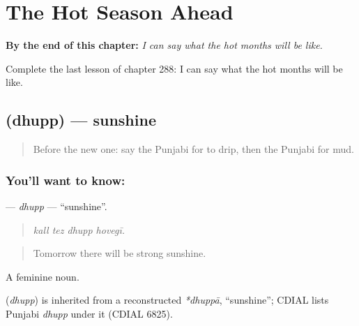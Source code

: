 
\chapter{The Hot Season Ahead}
\label{ch:pa-a2-the-hot-season-ahead}

\begin{chapteropening}
\textbf{By the end of this chapter:} \emph{I can say what the hot months will be like.}

Complete the last lesson of chapter 288: I can say what the hot months will be like.
\end{chapteropening}

\section[\texorpdfstring{\pa{ਧੁੱਪ} (dhupp)}{ਧੁੱਪ (dhupp)}]{ (dhupp) — sunshine}

\label{lesson:PA-C288-dhupp}



\begin{quote}
Before the new one: say the Punjabi for to drip, then the Punjabi for mud.
\end{quote}

\subsection*{You'll want to know: }
\textbf{} — \emph{dhupp} — \textquotedblleft{}sunshine\textquotedblright{}.

\begin{quote}
   
\end{quote}

\begin{quote}
\emph{kall tez dhupp hovegī.}
\end{quote}

\begin{quote}
Tomorrow there will be strong sunshine.
\end{quote}

A feminine noun.

\begin{cousinweb}
\textbf{} (\emph{dhupp}) is inherited from a reconstructed \emph{*dhuppā}, \textquotedblleft{}sunshine\textquotedblright{}; CDIAL lists Punjabi \emph{dhupp} under it (CDIAL 6825).
\end{cousinweb}

